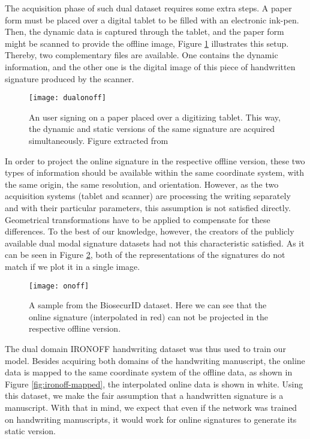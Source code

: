 The acquisition phase of such dual dataset requires some extra steps. A paper form must be placed over a digital tablet to be filled with an electronic ink-pen. Then, the dynamic data is captured through the tablet, and the paper form might be scanned to provide the offline image, Figure \ref{fig:dualonoff} illustrates this setup. Thereby, two complementary files are available. One contains the dynamic information, and the other one is the digital image of this piece of handwritten signature produced by the scanner. 
\begin{figure}[!htb]
\centering
\texttt{[image: dualonoff]}

\caption{An user signing on a paper placed over a digitizing tablet. This way, the dynamic and static versions of the same signature are acquired simultaneously. Figure extracted from \cite{galbally2015line}}
\label{fig:dualonoff}
\end{figure}

In order to project the online signature in the respective offline version, these two types of information should be available within the same coordinate system, with the same origin, the same resolution, and orientation. However, as the two acquisition systems (tablet and scanner) are processing the writing separately and with their particular parameters, this assumption is not satisfied directly. Geometrical transformations have to be applied to compensate for these differences. To the best of our knowledge, however, the creators of the publicly available dual modal signature datasets \cite{biosecurid, biomet, myidea, sigcomp2009, sigma, sigwicomp2013, sigwicomp2015} had not this characteristic satisfied. As it can be seen in Figure \ref{fig:onoff}, both of the representations of the signatures do not match if we plot it in a single image.

\begin{figure}[!htb]
\centering
\texttt{[image: onoff]}
\caption{A sample from the BiosecurID dataset. Here we can see that the online signature (interpolated in red) can not be projected in the respective offline version.}
\label{fig:onoff}
\end{figure}

The dual domain IRONOFF \cite{viard1999ireste} handwriting dataset was thus used to train our model. Besides acquiring both domains of the handwriting manuscript, the online data is mapped to the same coordinate system of the offline data, as shown in Figure \ref{fig:ironoff-mapped}, the interpolated online data is shown in white. Using this dataset, we make the fair assumption that a handwritten signature is a manuscript. With that in mind, we expect that even if the network was trained on handwriting manuscripts, it would work for online signatures to generate its static version.

